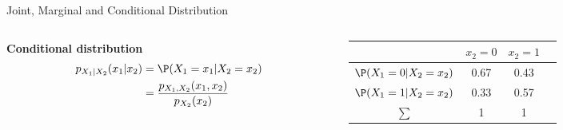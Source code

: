 \documentclass[11pt,compress,t,notes=noshow, aspectratio=169, xcolor=table]{beamer}
\begin{document}
\begin{frame}{Joint, Marginal and Conditional Distribution}
    \medskip\pause
    
\begin{columns}[c, totalwidth=\textwidth]
    \begin{column}{0.5\textwidth}
    \textbf{Conditional distribution}
        \begin{align*}
            p_{X_1|X_2}(x_1 | x_2) &= \P(X_1=x_1| X_2 = x_2) \\&= \frac{p_{X_1, X_2}(x_1,x_2)}{p_{X_2}(x_2)}
        \end{align*}
 
    \end{column}
    \begin{column}{0.5\textwidth}
    \begin{table}
    \scriptsize
        \begin{tabular}{|c|c|c|c|}
            \hline 
             & $x_2 = 0$ & $x_2 = 1$ \\
            \hline
            $\P(X_1 = 0|X_2 =x_2)$ & \cellcolor{gray} 0.67 & \cellcolor{gray}0.43   \\
            \hline
            $\P(X_1 = 1|X_2 =x_2)$ & \cellcolor{gray} 0.33 & \cellcolor{gray}0.57   \\
            \hline
            $\sum$ & 1 & 1  \\
            \hline
        \end{tabular}
    \end{table}
    \end{column}
    \end{columns} 
\end{frame}
\end{document}
